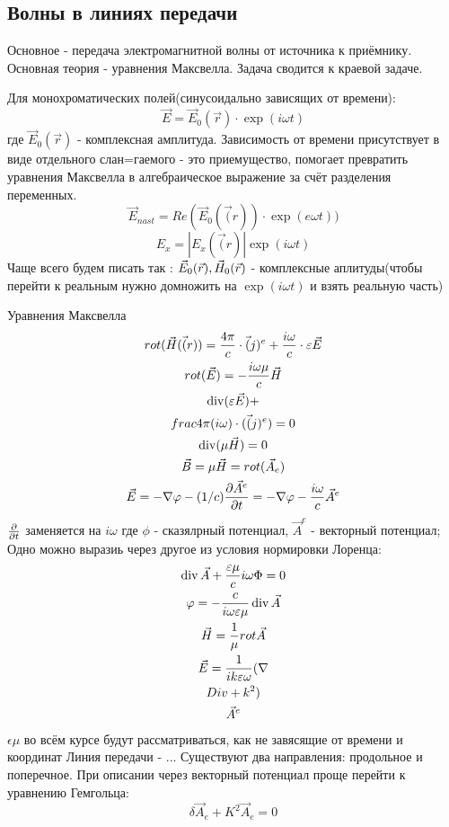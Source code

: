 \subsection{Волны в линиях передачи}
Основное - передача электромагнитной волны от источника к приёмнику.
Основная теория - уравнения Максвелла. Задача сводится к краевой задаче.

 Для монохроматических полей(синусоидально зависящих от времени):
  \begin{equation}
	\vec{E} = \vec{E}_0(\vec{r})\cdot \exp(i\omega t)
\end{equation}
где $\vec{E}_0(\vec{r})$ - комплексная амплитуда.
Зависимость от времени присутствует в виде отдельного слан=гаемого - это приемущество, помогает превратить уравнения Максвелла в алгебраическое выражение за счёт разделения переменных.
 \begin{equation}
 	\vec{E}_{nast} = Re(\vec{E}_0(\vec(r))\cdot \exp(e\omega t))
\end{equation}
\begin{equation}
	E_x = |E_x(\vec(r)| \exp(i\omega t)
\end{equation}
Чаще всего будем писать так : $\vec{E}_0\qty(\vec{r}), \vec{H}_0\qty(\vec{r})$ - комплексные аплитуды(чтобы перейти к реальным нужно домножить на $\exp(i\omega t)$  и взять реальную часть)
 
 	Уравнения Максвелла
\begin{gather}
 	rot(\vec{H}(\vec(r)) = \frac{4\pi}{c} \cdot \vec(j)^e + \frac{i \omega}{c} \cdot \varepsilon \vec{E}
\\
 	rot(\vec{E}) = -\frac{i \omega \mu}{c} \vec{H}
\\
 	\operatorname{div}(\varepsilon \vec{E}) + \\frac{4\pi}{(i\omega)} \cdot(\vec(j)^e) = 0
\\
 	\operatorname{div}(\mu \vec{H}) = 0
\\
 	\vec{B} = \mu \vec{H} = rot(\vec{A}_e)
\\
 	\vec{E} = - \nabla\varphi - (1/c) \frac{\partial \vec{A}^e}{\partial t} = - \nabla{\varphi} - \frac{i \omega}{c} \vec{A}^e
\end{gather}
$\pdv{t}$ заменяется на  $i \omega $ где 
$\phi$ - сказялрный потенциал, $\vec{A}^e$  - векторный потенциал;
Одно можно выразиь через другое из условия нормировки Лоренца:
\begin{gather}
	\operatorname{div}{\vec{A}} + \frac{\varepsilon \mu}{c} i \omega \Phi = 0\\
	\varphi = - \frac{c}{i \omega \varepsilon \mu} \operatorname{div}{\vec{A}}\\
	\vec{H} = \frac{1}{\mu} rot{\vec{A}}\\
	\vec{E} = \frac{1}{i k \varepsilon \omega} (\nabla\\Div + k^2)\\
 \vec{A}^e
\end{gather}
$ \epsilon \mu $  во всём курсе будут рассматриваться, как не завясящие от времени и координат
Линия передачи -  ...
Существуют два направления: продольное и поперечное.
При описании через векторный потенциал проще перейти к уравнению Гемгольца:
\begin{equation}
	\delta \vec{A}_e + K^2 \vec{A}_e = 0
\end{equation}

